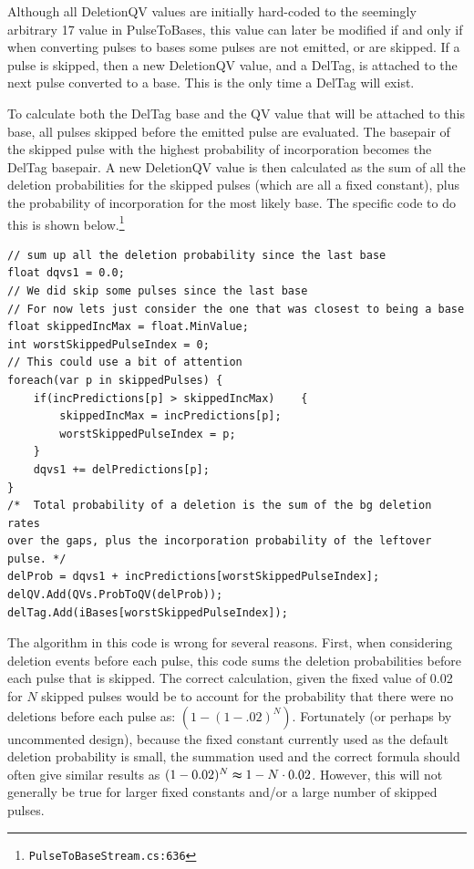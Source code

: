 \documentclass[fleqn,10pt]{SelfArx} %
\begin{document}
Although all DeletionQV values are initially hard-coded to the seemingly arbitrary 17 value in PulseToBases, this value can later be modified if and only if when converting pulses to bases some pulses are not emitted, or are skipped.  If a pulse is skipped, then a new DeletionQV value, and a DelTag, is attached to the next pulse converted to a base.  This is the only time a DelTag will exist.

To calculate both the DelTag base and the QV value that will be attached to this base, all pulses skipped before the emitted pulse are evaluated.  The basepair of the skipped pulse with the highest probability of incorporation becomes the DelTag basepair.  A new DeletionQV value is then calculated as the sum of all the deletion probabilities for the skipped pulses (which are all a fixed constant), plus the probability of incorporation for the most likely base.  The specific code to do this is shown below.\footnote{\texttt{PulseToBaseStream.cs:636}}

\lstset{style=sharpc}
\begin{lstlisting}[frame=single]
// sum up all the deletion probability since the last base
float dqvs1 = 0.0;
// We did skip some pulses since the last base
// For now lets just consider the one that was closest to being a base
float skippedIncMax = float.MinValue;
int worstSkippedPulseIndex = 0;
// This could use a bit of attention
foreach(var p in skippedPulses) {
    if(incPredictions[p] > skippedIncMax)    {
        skippedIncMax = incPredictions[p];
        worstSkippedPulseIndex = p;
    }
    dqvs1 += delPredictions[p];
}
/*  Total probability of a deletion is the sum of the bg deletion rates 
over the gaps, plus the incorporation probability of the leftover 
pulse. */
delProb = dqvs1 + incPredictions[worstSkippedPulseIndex];
delQV.Add(QVs.ProbToQV(delProb));
delTag.Add(iBases[worstSkippedPulseIndex]);
\end{lstlisting}

The algorithm in this code is wrong for several reasons.  First, when considering deletion events before each pulse, this code sums the deletion probabilities before each pulse that is skipped. The correct calculation, given the fixed value of 0.02 for $N$ skipped pulses would be to account for the probability that there were no deletions before each pulse as: $ (1 - (1-.02)^N)$.  Fortunately (or perhaps by uncommented design), because the fixed constant currently used as the default deletion probability is small, the summation used and the correct formula should often give similar results as $(1-0.02)^N \thickapprox 1 - N\cdot0.02$.  However, this will not generally be true for larger fixed constants and/or a large number of skipped pulses.
\end{document}
